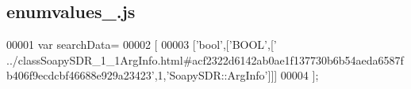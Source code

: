 \subsection{enumvalues\+\_.\+js}
\label{enumvalues__0_8js_source}

\begin{DoxyCode}
00001 var searchData=
00002 [
00003   [\textcolor{stringliteral}{'bool'},[\textcolor{stringliteral}{'BOOL'},[\textcolor{stringliteral}{'
      ../classSoapySDR\_1\_1ArgInfo.html#acf2322d6142ab0ae1f137730b6b54aeda6587fb406f9ecdcbf46688e929a23423'},1,\textcolor{stringliteral}{'SoapySDR::ArgInfo'}]]]
00004 ];
\end{DoxyCode}

